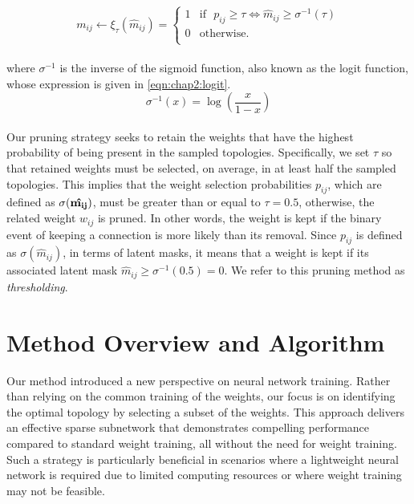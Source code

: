\begin{equation}
  m_{ij} \leftarrow \xi_\tau(\hat{m}_{ij}) =
  \left\{
  \begin{array}{ll}
    1 & \text{if~~}  p_{ij} \geq \tau \Leftrightarrow  \hat{m}_{ij} \geq \sigma^{-1}(\tau) \\
    0 & \text{otherwise.}                                                                       \\
  \end{array}
  \right.
  \label{eq:chap2:pruning}
\end{equation}\\

\noindent where $\sigma^{-1}$ is the inverse of the sigmoid function, also known
as the logit function, whose expression is given in \cref{eqn:chap2:logit}.\\

\begin{equation}
  \sigma^{-1}(x) = \log\left(\frac{x}{1-x}\right)
  \label{eqn:chap2:logit}
\end{equation}\\

Our pruning strategy seeks to retain the weights that have the highest
probability of being present in the sampled topologies. Specifically, we set
$\tau$ so that retained weights must be selected, on average, in at least half
the sampled topologies. This implies that the weight selection probabilities
$p_{ij}$, which are defined as $\sigma(\bf{\hat{m_{ij}}})$, must be greater than
or equal to $\tau=0.5$, otherwise, the related weight $w_{ij}$ is pruned. In
other words, the weight is kept if the binary event of keeping a connection is
more likely than its removal. Since $p_{ij}$ is defined as
$\sigma(\hat{m}_{ij})$, in terms of latent masks, it means that a weight is kept
if its associated latent mask $\hat{m}_{ij} \geq \sigma^{-1}(0.5)=0$. We refer
to this pruning method as \textit{thresholding}.\\


\section{Method Overview and Algorithm}\label{sec:chap2:overview}
Our method introduced a new perspective on neural network training. Rather than
relying on the common training of the weights, our focus is on identifying the
optimal topology by selecting a subset of the weights. This approach delivers an
effective sparse subnetwork that demonstrates compelling performance compared to
standard weight training, all without the need for weight training. Such a
strategy is particularly beneficial in scenarios where a lightweight neural
network is required due to limited computing resources or where weight training
may not be feasible.\\

